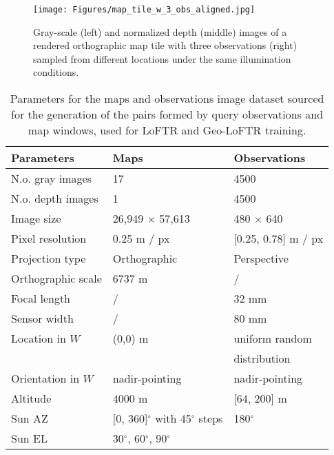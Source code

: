 \begin{figure}
    \centering
    \begin{minipage}[b]{0.9\linewidth}
        \centering
        \texttt{[image: Figures/map\_tile\_w\_3\_obs\_aligned.jpg]}
    \end{minipage}
    \caption{\label{fig:map_tile_w_obs} Gray-scale (left) and normalized depth (middle) images of a rendered orthographic map tile with three observations (right) sampled from different locations under the same illumination conditions.}
\end{figure}


\begin{table}
\centering
\begin{tabular}{l l l}
\textbf{Parameters} & \textbf{Maps} & \textbf{Observations} \\ \hline 
N.o. gray images & 17 & 4500 \\
N.o. depth images & 1 & 4500 \\
Image size & 26,949 $\times$ 57,613  & 480 $\times$ 640  \\ 
Pixel resolution & 0.25 m / px  &  [0.25, 0.78] m / px \\
Projection type  & Orthographic & Perspective \\  
Orthographic scale & 6737 m & / \\
Focal length & / & 32 mm \\
Sensor width & / & 80 mm \\
Location in $W$ & (0,0) m &  uniform random \\
&  &  distribution \\
Orientation in $W$ & nadir-pointing & nadir-pointing \\
Altitude & 4000 m & [64, 200] m\\
Sun AZ   & [0, 360]$^{\circ}$ with 45$^{\circ}$ steps & 180$^{\circ}$ \\  
Sun EL & 30$^{\circ}$, 60$^{\circ}$, 90$^{\circ}$ \\  
\end{tabular}
\caption{\label{tab:dataset_params} Parameters for the maps and observations image dataset sourced for the generation of the pairs formed by query observations and map windows, used for LoFTR and Geo-LoFTR training.}
\end{table}